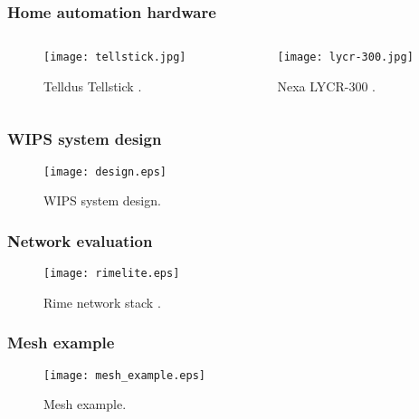 \documentclass{beamer}
\begin{document}
\begin{frame}
\frametitle{Home automation hardware}

	\begin{columns}

	
		\begin{center}
			\begin{figure}
				\texttt{[image: tellstick.jpg]}
				\caption{Telldus Tellstick \cite{tellstick}.}
			\end{figure}
		\end{center}


		\begin{center}
			\begin{figure}
				\texttt{[image: lycr-300.jpg]}
				\caption{Nexa LYCR-300 \cite{lycr-300}.}
			\end{figure}
		\end{center}

	\end{columns}

\end{frame}

\begin{frame}
\frametitle{WIPS system design}

	\begin{center}
		\begin{figure}
			\texttt{[image: design.eps]}
			\caption{WIPS system design.}
		\end{figure}
	\end{center}

\end{frame}

\begin{frame}
\frametitle{Network evaluation}

	\begin{center}
		\begin{figure}
			\texttt{[image: rimelite.eps]}
			\caption{Rime network stack \cite{rime}.}
		\end{figure}
	\end{center}

\end{frame}

\begin{frame}
\frametitle{Mesh example}
	
	\begin{center}
		\begin{figure}
			\texttt{[image: mesh\_example.eps]}
			\caption{Mesh example.}
		\end{figure}
	\end{center}
	
\end{frame}
\end{document}
